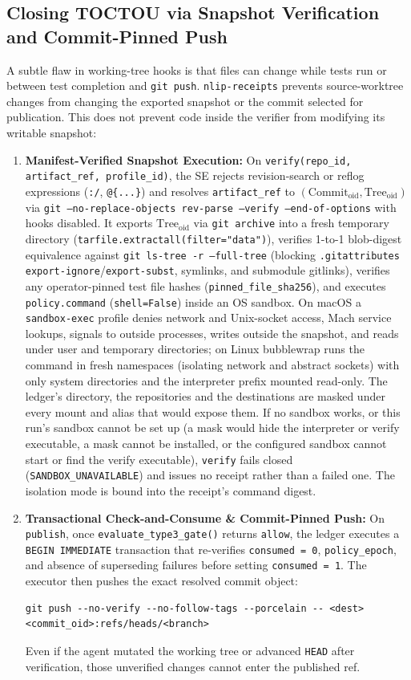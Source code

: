 \documentclass[sigconf,nonacm]{acmart}
\begin{document}
\subsection{Closing TOCTOU via Snapshot Verification and Commit-Pinned Push}
\label{sec:snapshot}
A subtle flaw in working-tree hooks is that files can change while tests run or between test completion and \texttt{git push}. \texttt{nlip-receipts} prevents source-worktree changes from changing the exported snapshot or the commit selected for publication. This does not prevent code inside the verifier from modifying its writable snapshot:
\begin{enumerate}
  \item \textbf{Manifest-Verified Snapshot Execution:} On \texttt{verify(repo\_id, artifact\_ref, profile\_id)}, the SE rejects revision-search or reflog expressions (\texttt{:/}, \texttt{@\{...\}}) and resolves \texttt{artifact\_ref} to $(\text{Commit}_{\text{oid}}, \text{Tree}_{\text{oid}})$ via \texttt{git --no-replace-objects rev-parse --verify --end-of-options} with hooks disabled. It exports $\text{Tree}_{\text{oid}}$ via \texttt{git archive} into a fresh temporary directory (\texttt{tarfile.extractall(filter="data")}), verifies 1-to-1 blob-digest equivalence against \texttt{git ls-tree -r --full-tree} (blocking \texttt{.gitattributes} \texttt{export-ignore}/\texttt{export-subst}, symlinks, and submodule gitlinks), verifies any operator-pinned test file hashes (\texttt{pinned\_file\_sha256}), and executes \texttt{policy.command} (\texttt{shell=False}) inside an OS sandbox. On macOS a \texttt{sandbox-exec} profile denies network and Unix-socket access, Mach service lookups, signals to outside processes, writes outside the snapshot, and reads under user and temporary directories; on Linux bubblewrap runs the command in fresh namespaces (isolating network and abstract sockets) with only system directories and the interpreter prefix mounted read-only. The ledger's directory, the repositories and the destinations are masked under every mount and alias that would expose them. If no sandbox works, or this run's sandbox cannot be set up (a mask would hide the interpreter or verify executable, a mask cannot be installed, or the configured sandbox cannot start or find the verify executable), \texttt{verify} fails closed (\texttt{SANDBOX\_UNAVAILABLE}) and issues no receipt rather than a failed one. The isolation mode is bound into the receipt's command digest.
  \item \textbf{Transactional Check-and-Consume \& Commit-Pinned Push:} On \texttt{publish}, once \texttt{evaluate\_type3\_gate()} returns \texttt{allow}, the ledger executes a \texttt{BEGIN IMMEDIATE} transaction that re-verifies \texttt{consumed = 0}, \texttt{policy\_epoch}, and absence of superseding failures before setting \texttt{consumed = 1}. The executor then pushes the exact resolved commit object:
  \begin{lstlisting}
git push --no-verify --no-follow-tags --porcelain -- <dest> <commit_oid>:refs/heads/<branch>
  \end{lstlisting}
  Even if the agent mutated the working tree or advanced \texttt{HEAD} after verification, those unverified changes cannot enter the published ref.
\end{enumerate}
\end{document}
